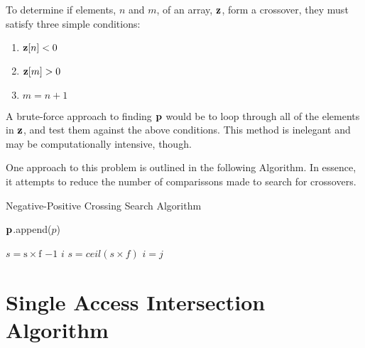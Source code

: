 To determine if elements, $n$ and $m$, of an array, $\bm{\mathrm{z}}$, form a crossover,
they must satisfy three simple conditions:

\begin{enumerate}
    \item $\bm{\mathrm{z}}[n] < 0$
    \item $\bm{\mathrm{z}}[m] > 0$ 
    \item $m = n+1$
\end{enumerate}


A brute-force approach to finding $\bm{\mathrm{p}}$ would be to loop through all of the
elements in $\bm{\mathrm{z}}$, and test them against the above conditions. This method
is inelegant and may be computationally intensive, though.

One approach to this problem is outlined in the following Algorithm. In
essence, it attempts to reduce the number of comparissons made to search for
crossovers. 

\begin{algorithm}[h] 
    \caption{Negative-Positive Crossing Search Algorithm} 
    \label{alg:crossover}
    \begin{algorithmic}[1] 

	     

		 \State
		$\bm{\mathrm{p}}$.append($p$) \EndWhile 
		\State \Return {}
	\EndFunction

	\State

	    \State $s = \mathrm{s \times f}$  
	    \State \Return $-1$	  
	    \State \Return $i$ 
	    \Else
		\State $s = ceil(s \times f)$
	    \EndIf
	\Else
	    \State $i=j$
	\EndIf
	\State \Return {}
	\EndFunction 
    \end{algorithmic} 
\end{algorithm}



\section{Single Access Intersection Algorithm} \label{alg:contains}


